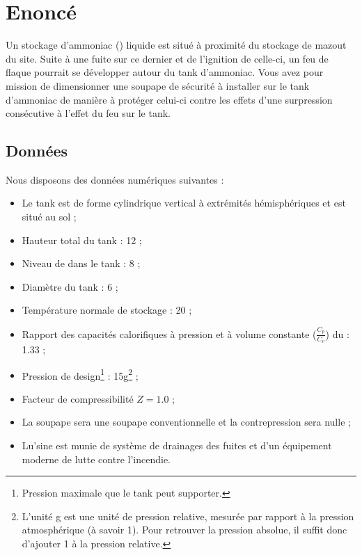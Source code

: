 
\usepackage[numbered, framed]{mcode}

\section{Enoncé}
Un stockage d’ammoniac () liquide est
situé à proximité du stockage de mazout du site.
Suite à une fuite sur ce dernier et de l’ignition
de celle-ci, un feu de flaque pourrait se développer
autour du tank d’ammoniac.  Vous avez pour mission
de dimensionner une soupape de sécurité à installer
sur le tank d’ammoniac de manière à protéger celui-ci
contre les effets d’une surpression consécutive à 
l’effet du feu sur le tank.

\subsection{Données}
Nous disposons des données numériques suivantes :

\begin{itemize}
	\item Le tank est de forme cylindrique vertical à 
	extrémités hémisphériques et est situé au sol ;
	\item Hauteur total du tank : \unit{12}{\meter} ;
	\item Niveau de  dans le tank : \unit{8}{\meter} ;
	\item Diamètre du tank : \unit{6}{\meter} ;
	\item Température normale de stockage : \unit{20}{\degreecelsius} ;
	\item Rapport des capacités calorifiques à pression
	et à volume constante ($\frac{C_p}{C_v}$) du  : 1.33 ;
	\item Pression de design\footnote{Pression maximale
	que le tank peut supporter.} : \unit{15}{\bbar g}\footnote{L'unité
	\unit{}{\bbar g} est une unité de pression relative, mesurée par 
	rapport à la pression atmosphérique (à savoir \unit{1}{\bbar}). Pour
	retrouver la pression absolue, il suffit donc d'ajouter \unit{1}{\bbar}
	à la pression relative.} ;
	\item Facteur de compressibilité $Z = 1.0$ ;
	\item La soupape sera une soupape conventionnelle et 
	la contrepression sera nulle ;
	\item Lu'sine est munie de système de drainages des fuites 
	et d'un équipement moderne de lutte contre l'incendie.
\end{itemize}

